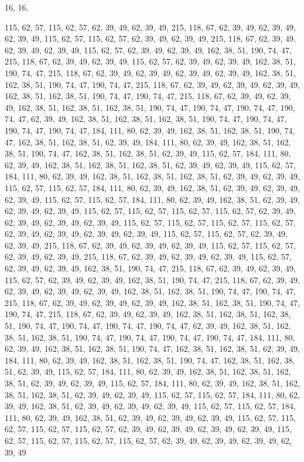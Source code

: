 16, 16,

115, 62, 57, 115, 62, 57, 62, 39, 49, 62, 39, 49, 215, 118, 67, 62,
39, 49, 62, 39, 49, 62, 39, 49, 115, 62, 57, 115, 62, 57, 62, 39,
49, 62, 39, 49, 215, 118, 67, 62, 39, 49, 62, 39, 49, 62, 39, 49,
115, 62, 57, 62, 39, 49, 62, 39, 49, 162, 38, 51, 190, 74, 47, 215,
118, 67, 62, 39, 49, 62, 39, 49, 115, 62, 57, 62, 39, 49, 62, 39,
49, 162, 38, 51, 190, 74, 47, 215, 118, 67, 62, 39, 49, 62, 39, 49,
62, 39, 49, 62, 39, 49, 162, 38, 51, 162, 38, 51, 190, 74, 47, 190,
74, 47, 215, 118, 67, 62, 39, 49, 62, 39, 49, 62, 39, 49, 162, 38,
51, 162, 38, 51, 190, 74, 47, 190, 74, 47, 215, 118, 67, 62, 39, 49,
62, 39, 49, 162, 38, 51, 162, 38, 51, 162, 38, 51, 190, 74, 47, 190,
74, 47, 190, 74, 47, 190, 74, 47, 62, 39, 49, 162, 38, 51, 162, 38,
51, 162, 38, 51, 190, 74, 47, 190, 74, 47, 190, 74, 47, 190, 74, 47,
184, 111, 80, 62, 39, 49, 162, 38, 51, 162, 38, 51, 190, 74, 47, 162,
38, 51, 162, 38, 51, 62, 39, 49, 184, 111, 80, 62, 39, 49, 162, 38,
51, 162, 38, 51, 190, 74, 47, 162, 38, 51, 162, 38, 51, 62, 39, 49,
115, 62, 57, 184, 111, 80, 62, 39, 49, 162, 38, 51, 162, 38, 51, 162,
38, 51, 62, 39, 49, 62, 39, 49, 115, 62, 57, 184, 111, 80, 62, 39,
49, 162, 38, 51, 162, 38, 51, 162, 38, 51, 62, 39, 49, 62, 39, 49,
115, 62, 57, 115, 62, 57, 184, 111, 80, 62, 39, 49, 162, 38, 51, 62,
39, 49, 62, 39, 49, 62, 39, 49, 115, 62, 57, 115, 62, 57, 184, 111,
80, 62, 39, 49, 162, 38, 51, 62, 39, 49, 62, 39, 49, 62, 39, 49,
115, 62, 57, 115, 62, 57, 115, 62, 57, 115, 62, 57, 62, 39, 49, 62,
39, 49, 62, 39, 49, 62, 39, 49, 115, 62, 57, 115, 62, 57, 115, 62,
57, 115, 62, 57, 62, 39, 49, 62, 39, 49, 62, 39, 49, 62, 39, 49,
115, 62, 57, 115, 62, 57, 62, 39, 49, 62, 39, 49, 215, 118, 67, 62,
39, 49, 62, 39, 49, 62, 39, 49, 115, 62, 57, 115, 62, 57, 62, 39,
49, 62, 39, 49, 215, 118, 67, 62, 39, 49, 62, 39, 49, 62, 39, 49,
115, 62, 57, 62, 39, 49, 62, 39, 49, 162, 38, 51, 190, 74, 47, 215,
118, 67, 62, 39, 49, 62, 39, 49, 115, 62, 57, 62, 39, 49, 62, 39,
49, 162, 38, 51, 190, 74, 47, 215, 118, 67, 62, 39, 49, 62, 39, 49,
62, 39, 49, 62, 39, 49, 162, 38, 51, 162, 38, 51, 190, 74, 47, 190,
74, 47, 215, 118, 67, 62, 39, 49, 62, 39, 49, 62, 39, 49, 162, 38,
51, 162, 38, 51, 190, 74, 47, 190, 74, 47, 215, 118, 67, 62, 39, 49,
62, 39, 49, 162, 38, 51, 162, 38, 51, 162, 38, 51, 190, 74, 47, 190,
74, 47, 190, 74, 47, 190, 74, 47, 62, 39, 49, 162, 38, 51, 162, 38,
51, 162, 38, 51, 190, 74, 47, 190, 74, 47, 190, 74, 47, 190, 74, 47,
184, 111, 80, 62, 39, 49, 162, 38, 51, 162, 38, 51, 190, 74, 47, 162,
38, 51, 162, 38, 51, 62, 39, 49, 184, 111, 80, 62, 39, 49, 162, 38,
51, 162, 38, 51, 190, 74, 47, 162, 38, 51, 162, 38, 51, 62, 39, 49,
115, 62, 57, 184, 111, 80, 62, 39, 49, 162, 38, 51, 162, 38, 51, 162,
38, 51, 62, 39, 49, 62, 39, 49, 115, 62, 57, 184, 111, 80, 62, 39,
49, 162, 38, 51, 162, 38, 51, 162, 38, 51, 62, 39, 49, 62, 39, 49,
115, 62, 57, 115, 62, 57, 184, 111, 80, 62, 39, 49, 162, 38, 51, 62,
39, 49, 62, 39, 49, 62, 39, 49, 115, 62, 57, 115, 62, 57, 184, 111,
80, 62, 39, 49, 162, 38, 51, 62, 39, 49, 62, 39, 49, 62, 39, 49,
115, 62, 57, 115, 62, 57, 115, 62, 57, 115, 62, 57, 62, 39, 49, 62,
39, 49, 62, 39, 49, 62, 39, 49, 115, 62, 57, 115, 62, 57, 115, 62,
57, 115, 62, 57, 62, 39, 49, 62, 39, 49, 62, 39, 49, 62, 39, 49
